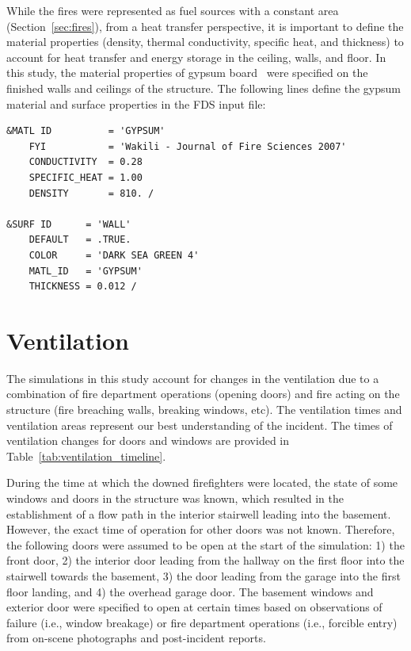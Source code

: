 \documentclass[12pt,oneside]{book}
\begin{document}
While the fires were represented as fuel sources with a constant area (Section~\ref{sec:fires}), from a heat transfer perspective, it is important to define the material properties (density, thermal conductivity, specific heat, and thickness) to account for heat transfer and energy storage in the ceiling, walls, and floor. In this study, the material properties of gypsum board~\cite{WAKILI2007} were specified on the finished walls and ceilings of the structure. The following lines define the gypsum material and surface properties in the FDS input file:

\begin{lstlisting}
&MATL ID          = 'GYPSUM'
    FYI           = 'Wakili - Journal of Fire Sciences 2007' 
    CONDUCTIVITY  = 0.28
    SPECIFIC_HEAT = 1.00
    DENSITY       = 810. /

&SURF ID      = 'WALL'
    DEFAULT   = .TRUE.
    COLOR     = 'DARK SEA GREEN 4'
    MATL_ID   = 'GYPSUM'
    THICKNESS = 0.012 /
\end{lstlisting}

\section{Ventilation}
\label{sec:ventilation}

The simulations in this study account for changes in the ventilation due to a combination of fire department operations (opening doors) and fire acting on the structure (fire breaching walls, breaking windows, etc). The ventilation times and ventilation areas represent our best understanding of the incident. The times of ventilation changes for doors and windows are provided in Table~\ref{tab:ventilation_timeline}.

During the time at which the downed firefighters were located, the state of some windows and doors in the structure was known, which resulted in the establishment of a flow path in the interior stairwell leading into the basement. However, the exact time of operation for other doors was not known. Therefore, the following doors were assumed to be open at the start of the simulation: 1) the front door, 2) the interior door leading from the hallway on the first floor into the stairwell towards the basement, 3) the door leading from the garage into the first floor landing, and 4) the overhead garage door. The basement windows and exterior door were specified to open at certain times based on observations of failure (i.e., window breakage) or fire department operations (i.e., forcible entry) from on-scene photographs and post-incident reports.
\end{document}
